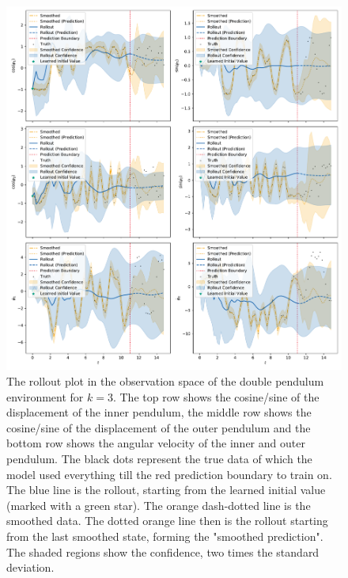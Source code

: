 		\begin{figure}
			\centering
			\includegraphics[width=0.9\linewidth]{figures/results/acrobot-gym/run-latent-dim-03/rollout-observations-N0.pdf}
			\caption[Rollout of the double pendulum experiment for 3 latent dimensions]{The rollout plot in the observation space of the double pendulum environment for \(k = 3\). The top row shows the cosine/sine of the displacement of the inner pendulum, the middle row shows the cosine/sine of the displacement of the outer pendulum and the bottom row shows the angular velocity of the inner and outer pendulum. The black dots represent the true data of which the model used everything till the red prediction boundary to train on. The blue line is the rollout, starting from the learned initial value (marked with a green star). The orange dash-dotted line is the smoothed data. The dotted orange line then is the rollout starting from the last smoothed state, forming the "smoothed prediction". The shaded regions show the confidence, \ie two times the standard deviation.}
			\label{fig:acrobotRolloutL03}
		\end{figure}

